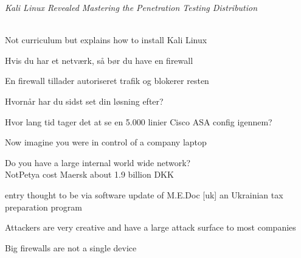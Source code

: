 \documentclass[Screen16to9,17pt]{foils}
\begin{document}


\emph{Kali Linux Revealed  Mastering the Penetration Testing Distribution}

\\
Not curriculum but explains how to install Kali Linux



\begin{list2}
\item Hvis du har et netværk, så bør du have en firewall
\item En firewall tillader autoriseret trafik og blokerer resten
\item Hvornår har du sidst set din løsning efter?
\item Hvor lang tid tager det at se en 5.000 linier Cisco ASA config igennem?
\end{list2}



\begin{list2}
\item Now imagine you were in control of a company laptop
\item Do you have a large internal world wide network?\\
NotPetya cost Maersk about 1.9 billion DKK

\item entry thought to be via software update of M.E.Doc [uk] an Ukrainian tax preparation program
\item Attackers are very creative and have a large attack surface to most companies
\end{list2}



\centerline{Big firewalls are not a single device}
\end{document}

